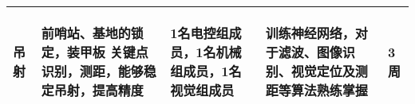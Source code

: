 \begin{longtable}{ p{2cm} | p{3cm} | p{3cm} | p{4.8cm} | p{2cm} |}
    \hline

        \begin{center}
            吊射
        \end{center} &
        \begin{center}
            前哨站、基地的锁定，装甲板 关键点识别，测距，能够稳定吊射，提高精度
        \end{center} &
        \begin{center}
            1名电控组成员，1名机械组成员，1名视觉组成员
        \end{center} &
        \begin{center}
            训练神经网络，对于滤波、图像识别、视觉定位及测距等算法熟练掌握
        \end{center} &
        \begin{center}
            3周
        \end{center} \\

    \hline
    
\end{longtable}
